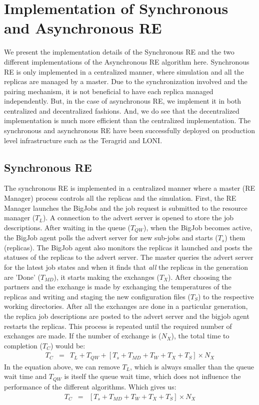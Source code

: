 \documentclass{rspublic}
\begin{document}
\section{Implementation of Synchronous and Asynchronous RE}
We present the implementation details of the Synchronous RE and the two different implementations of the Asynchronous RE algorithm here. Synchronous RE is only implemented in a centralized manner, where simulation and all the replicas are managed by a master. Due to the synchronization involved and the pairing mechanism, it is not beneficial to have each replica managed independently. But, in the case of asynchronous RE, we implement it in both centralized and decentralized  fashions. And, we do see that the decentralized implementation is much more efficient than the centralized implementation.
The synchronous and asynchronous RE have been successfully deployed on production level infrastructure such as the Teragrid and LONI. 

\subsection{Synchronous RE}

The synchronous RE is implemented in a centralized manner where a master (RE Manager) process controls all the replicas and the simulation. First, the RE Manager launches the BigJobs and the job request is submitted to the resource manager ($T_{L}$). A connection to the advert server is opened to store the job descriptions. %
After waiting in the queue ($T_{QW}$), when the BigJob becomes active, 
the BigJob agent polls the advert server for new sub-jobs 
and starts ($T_{s}$) them (replicas). The BigJob agent also monitors the 
replicas it launched and posts the statuses of the replicas to the advert 
server. The master queries the advert server for the latest job 
states and when it finds that \emph{all} the replicas in the generation are 'Done' ($T_{MD}$), it 
starts making the exchanges ($T_{X}$). After choosing the partners and the exchange is made by exchanging the temperatures of the replicas and writing and staging the new configuration files ($T_{S}$)
to the respective working directories. After all the exchanges 
are done in a particular generation, the replica job descriptions 
are posted to the advert server and the bigjob agent restarts the 
replicas. This process is repeated until the required number of 
exchanges are made. If the number of exchange is ($N_{X}$), the total time to completion ($T_{C}$) would be:
\begin{eqnarray}
T_{C} &=& T_{L}+T_{QW}+[T_{s}+T_{MD} + T_{W} + T_{X}+T_{S}] \times N_{X}
\label{eq:synch}
\end{eqnarray}
In the equation above, we can remove $T_{L}$, which is always smaller than the queue wait time and $T_{QW}$ is itself the queue wait time, which does not influence the performance of the different algorithms. Which gives us:
\begin{eqnarray}
T_{C} &=& [T_{s}+T_{MD} + T_{W} + T_{X}+T_{S}] \times N_{X}
\label{eq:synch}
\end{eqnarray}
\end{document}
